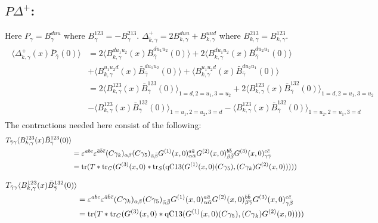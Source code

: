 \documentclass[12pt]{article}
\begin{document}
\subsection{$P \Delta^+$:}
Here $P_\gamma = B^{duu}_\gamma$ where $B^{123}_\gamma = -B^{213}_\gamma$.
$\Delta^+_{k,\gamma} = 2 B^{duu}_{k,\gamma} + B^{uud}_{k,\gamma}$ 
where $B^{213}_{k,\gamma}=B^{123}_{k,\gamma}$.
%
\begin{gather*}
\begin{split}
\langle \Delta^+_{k,\gamma}(x) \bar{P}_{\bar{\gamma}}(0)\rangle
 &= 2\langle B^{d u_1 u_2}_{k,\gamma}(x) \bar{B}^{d u_1 u_2}_{\bar{\gamma}}(0)\rangle
  + 2\langle B^{d u_1 u_2}_{k,\gamma}(x) \bar{B}^{d u_2 u_1}_{\bar{\gamma}}(0)\rangle\\
 &+  \langle B^{u_1 u_2 d}_{k,\gamma}(x) \bar{B}^{d u_1 u_2}_{\bar{\gamma}}(0)\rangle
  +  \langle B^{u_1 u_2 d}_{k,\gamma}(x) \bar{B}^{d u_2 u_1}_{\bar{\gamma}}(0)\rangle\\
 &= 2\langle B^{123}_{k,\gamma}(x) \bar{B}^{123}_{\bar{\gamma}}(0)\rangle_{1=d,2=u_1,3=u_2}
  + 2\langle B^{123}_{k,\gamma}(x) \bar{B}^{132}_{\bar{\gamma}}(0)\rangle_{1=d,2=u_1,3=u_2}\\
 &-  \langle B^{123}_{k,\gamma}(x) \bar{B}^{132}_{\bar{\gamma}}(0)\rangle_{1=u_1,2=u_2,3=d}
  -  \langle B^{123}_{k,\gamma}(x) \bar{B}^{132}_{\bar{\gamma}}(0)\rangle_{1=u_2,2=u_1,3=d}
\end{split}
\end{gather*}
The contractions needed here consist of the following:
%
\begin{gather*}
\begin{split}
T_{\bar{\gamma}\gamma} \langle B^{123}_{k,\gamma}(x) \bar{B}^{123}_{\bar{\gamma}}(0)\rangle\\
 &= \varepsilon^{abc}\varepsilon^{\bar{a}\bar{b}\bar{c}} 
    (C\gamma_k)_{\alpha\beta} (C\gamma_5)_{\bar{\alpha}\bar{\beta}}
    G^{(1)}(x,0)^{a\bar{a}}_{\alpha\bar{\alpha}}
    G^{(2)}(x,0)^{b\bar{b}}_{\beta\bar{\beta}}
    G^{(3)}(x,0)^{c\bar{c}}_{\gamma\bar{\gamma}}\\
 &= {\rm tr}(T * {\rm tr}_C(G^{(3)}(x,0)
  * {\rm tr}_S({\rm qC13}(G^{(1)}(x,0)(C\gamma_5),(C\gamma_k)G^{(2)}(x,0)))))
\end{split}
\end{gather*}

\begin{gather*}
\begin{split}
T_{\bar{\gamma}\gamma}\langle B^{123}_{k,\gamma}(x) \bar{B}^{132}_{\bar\gamma}(0)\rangle&\\
 &= \varepsilon^{abc}\varepsilon^{\bar{a}\bar{b}\bar{c}} 
    (C\gamma_k)_{\alpha\beta} (C\gamma_5)_{\bar{\alpha}\bar{\beta}}
    G^{(1)}(x,0)^{a\bar{a}}_{\alpha\bar{\alpha}}
    G^{(2)}(x,0)^{b\bar{b}}_{\beta\bar{\gamma}}
    G^{(3)}(x,0)^{c\bar{c}}_{\gamma\bar{\beta}}\\
 &= {\rm tr}(T * {\rm tr}_C(G^{(3)}(x,0)
  * {\rm qC13}(G^{(1)}(x,0)(C\gamma_5),(C\gamma_k)G^{(2)}(x,0))))
\end{split}
\end{gather*}
\end{document}
